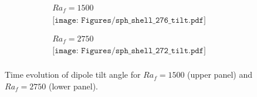 \begin{figure}[ht]
\begin{center}
\[
\begin{array}{c}
Ra_f = 1500  \\
\texttt{[image: Figures/sph\_shell\_276\_tilt.pdf]} \\
\\
\\
 Ra_f = 2750 \\
\texttt{[image: Figures/sph\_shell\_272\_tilt.pdf]} \\
\end{array}
\]
\end{center}
\caption{
Time evolution of dipole tilt angle for $Ra_f = 1500$ (upper panel) and $Ra_f = 2750$ (lower panel).
}
\label{Fig:more_cases}
\end{figure}